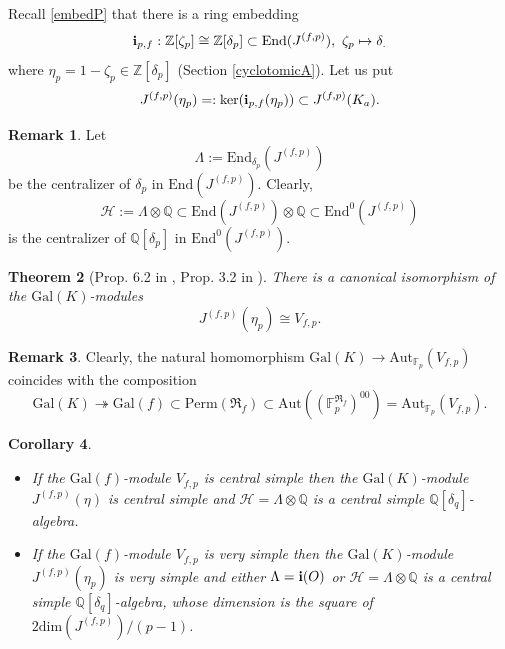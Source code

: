 \documentclass[12pt,a4paper,reqno]{amsart}
\def\Q{{\mathbb Q}}
\def\Z{{\mathbb Z}}
\def\R{{\mathbb R}}
\def\F{{\mathbb F}}
\def\R{{\mathfrak R}}
\def\Gal{\mathrm{Gal}}
\def\Perm{\mathrm{Perm}}
\def\End{\mathrm{End}}
\def\Aut{\mathrm{Aut}}
\def\dim{\mathrm{dim}}
\newtheorem{thm}{Theorem}[section]
\newtheorem{cor}[thm]{Corollary}
\theoremstyle{definition}
\newtheorem{rem}[thm]{Remark}
\begin{document}
Recall  \eqref{embedP} that there is a ring embedding
$${\bf i}_{p,f}: \Z[\zeta_p] \cong \Z[\delta_p] \subset \End(J^{(f,p)}), \ \zeta_p  \mapsto \delta_.$$
where $\eta_p=1-\zeta_p\in \Z[\delta_p] $ (Section \ref{cyclotomicA}). Let us put
\begin{equation}
\label{kerEtaJ}
J^{(f,p)}(\eta_p)=:\ker({\bf i}_{p,f}(\eta_p))\subset J^{(f,p)}(K_a).
\end{equation}





 







\begin{rem}
\label{HdeltaLambda}
Let 
$$\Lambda:=\End_{\delta_p}(J^{(f,p)})$$ 
be the centralizer of $\delta_p$ in $\End(J^{(f,p)})$.  Clearly,
$$\mathcal{H}:=\Lambda\otimes\Q \subset \End(J^{(f,p)})\otimes \Q\subset \End^0(J^{(f,p)})$$
is the centralizer of $\Q[\delta_p]$ in $\End^0(J^{(f,p)})$.
\end{rem}



\begin{thm}[Prop. 6.2 in \cite{Poonen}, Prop. 3.2 in \cite{SPoonen}]
\label{kereta}
There is a canonical isomorphism of the $\Gal(K)$-modules
$$ J^{(f,p)}(\eta_p) \cong V_{f,p}.$$
\end{thm}



\begin{rem}
\label{Galf}
Clearly, the natural homomorphism $\Gal(K) \to
\Aut_{\F_p}(V_{f,p})$ coincides with the composition
 $$\Gal(K)\twoheadrightarrow
\Gal(f)\subset \Perm(\R_f) \subset \Aut\left((\F_p^{\R_f})^{00}\right)= \Aut_{\F_p}(V_{f,p}).$$
\end{rem}

\begin{cor}
\label{normalLambdaCor}
\begin{itemize}
\item[(i)]
If the $\Gal(f)$-module $V_{f,p}$ is central simple then the $\Gal(K)$-module  $J^{(f,p)}(\eta)$ is central simple and 
$\mathcal{H}=\Lambda\otimes\Q$ is a central simple $\Q[\delta_q]$-algebra.

\item[(ii)]
If the $\Gal(f)$-module $V_{f,p}$  is very simple then  the  $\Gal(K)$-module  $J^{(f,p)}(\eta_p)$ is very simple and either
$\Lambda={\bf i}(O)$ or 
$\mathcal{H}=\Lambda\otimes\Q$ is a central simple $\Q[\delta_q]$-algebra, whose dimension is  the square of $2\dim(J^{(f,p)})/(p-1)$.
\end{itemize}
\end{cor}
\end{document}
